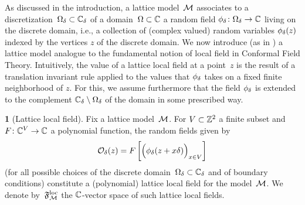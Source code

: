 \documentclass[12pt,oneside,english]{amsart}
\numberwithin{equation}{section}
\numberwithin{figure}{section}
\theoremstyle{plain}
\theoremstyle{plain}
\theoremstyle{plain}
\theoremstyle{plain}
\theoremstyle{remark}
\newtheorem{rem}[thm]{\protect\remarkname}
\theoremstyle{definition}
\newtheorem{defn}[thm]{\protect\definitionname}
\theoremstyle{plain}
\theoremstyle{plain}
\numberwithin{thm}{section}
\newcommand{\kallemod}[1]{{\color{kallecol} {#1}}}
\providecommand{\definitionname}{Definition}
\providecommand{\remarkname}{Remark}
\providecommand{\definitionname}{Definition}
\providecommand{\remarkname}{Remark}
\providecommand{\definitionname}{Definition}
\providecommand{\remarkname}{Remark}
\providecommand{\definitionname}{Definition}
\providecommand{\remarkname}{Remark}
\begin{document}
As discussed in the introduction, a lattice model~$\mathcal{M}$
associates to a 
discretization~${{\Omega}}_{{\delta}} \subset {\mathbb{C}_{{\delta}}}$ of a domain~${\Omega} \subset \mathbb{C}$
a random field ${\phi}_{{\delta}} \colon {{\Omega}}_{{\delta}} \to \mathbb{C}$
living on the discrete domain,
i.e., a collection of (complex valued) random variables
${\phi}_{{\delta}}(z)$ indexed by the 
vertices $z$ of the discrete domain.
We now introduce (as in \cite{gheissari-hongler-park}) a
lattice model analogue %
to the fundamental notion of local field
in Conformal Field Theory. %
Intuitively, the value of a lattice local field
at a point~$z$ is the result
of a translation invariant rule applied to the values that ${\phi}_{{\delta}}$
takes on a fixed finite neighborhood of $z$. For this, we assume furthermore 
that the field 
${\phi}_{{\delta}}$ is extended to the complement 
${\mathbb{C}_{{\delta}}} \setminus {{\Omega}}_{{\delta}}$ of the domain in some prescribed way.
\begin{defn}[Lattice local field]
\label{def:lattice-local-field}
Fix a lattice model~$\mathcal{M}$.
For $V \subset \mathbb{Z}^2$ %
a finite subset and $F \colon  \mathbb{C}^{V} \to  \mathbb{C} $ a polynomial
function, the random fields given by
\[ {\mathcal{O}}_{ {\delta}}(z)
= F \left[ \Big({\phi}_{ {\delta}}
         (z + x {\delta}) \Big)_{x\in V}\right]
\]
(for all possible choices of the discrete domain~${{\Omega}}_{{\delta}} \subset {\mathbb{C}_{{\delta}}}$ and 
of boundary conditions)
constitute a (polynomial) lattice local field for the 
model~$\mathcal{M}$.
We denote by~$\mathfrak{F}^\mathrm{loc}_{\mathcal{M}}$ the $\mathbb{C}$-vector space of such lattice local fields.
\end{defn}

\end{document}
